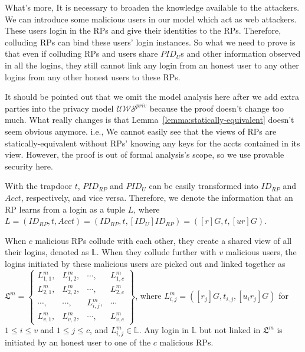   What's more, It is necessary to broaden the knowledge available to the attackers. 
  We can introduce some malicious users in our model which act as web attackers. 
  These users login in the RPs and give their identities to the RPs.
  Therefore, colluding RPs can bind these users' login instances. 
  So what we need to prove is that even if colluding RPs and users share $PID_U$s and other information observed in all the logins, they still cannot link any login from an honest user to any other logins from any other honest users to these RPs.

  It should be pointed out that we omit the model analysis here after we add extra parties into the privacy model $\mathcal{U\!W\!S}^{priv}$ because the proof doesn't change too much.
  What really changes is that Lemma~\ref{lemma:statically-equivalent} doesn't seem obvious anymore.
  i.e., We cannot easily see that the views of RPs are statically-equivalent without RPs' knowing any keys for the accts contained in its view.
  However, the proof is out of formal analysis's scope, so we use provable security here.
  \oldc

  With the trapdoor $t$, $PID_{RP}$ and $PID_U$ can be easily transformed into $ID_{RP}$ and $Acct$, respectively, and vice versa. Therefore, we denote the information that an RP learns from a login as a tuple $L$, where $L =(ID_{RP}, t, Acct)=(ID_{RP}, t, [ID_{U}]ID_{RP})=([r]G, t, [ur]G)$.

  When $c$ malicious RPs collude with each other, they create a shared view of all their logins, denoted as $\mathbb{L}$.
  When they collude further with $v$ malicious users, the logins initiated by these malicious users are picked out and linked together as
  $\mathfrak{L}^m=\left \{ \begin{matrix}
  L^m_{1,1},&L^m_{1,2},&\cdots,&L^m_{1,c}\\
  L^m_{2,1},& L^m_{2,2},&\cdots,&L^m_{2,c}\\
  \cdots,&\cdots,&L^m_{i,j},&\cdots\\
  L^m_{v,1},&L^m_{v,2},&\cdots,&L^m_{v,c}
  \end{matrix}\right\}$,
  where $L^m_{i, j}=([r_j]G, t_{i,j}, [u_ir_j]G)$ for $1 \le i \le v$ and $1 \le j \le c$, and $L^m_{i,j} \in \mathbb{L}$. Any login in $\mathbb{L}$ but not linked in $\mathfrak{L}^m$ is initiated by an honest user to one of the $c$ malicious RPs.



